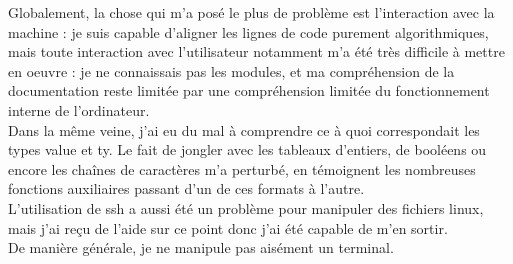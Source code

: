 \documentclass[a4paper]{article}
\begin{document}
    Globalement, la chose qui m'a posé le plus de problème est l'interaction avec la machine : je suis capable d'aligner les lignes de code purement algorithmiques, mais toute interaction avec l'utilisateur notamment m'a été très difficile à mettre en oeuvre : je ne connaissais pas les modules, et ma compréhension de la documentation reste limitée par une compréhension limitée du fonctionnement interne de l'ordinateur.\\
    Dans la même veine, j'ai eu du mal à comprendre ce à quoi correspondait les types value et ty. Le fait de jongler avec les tableaux d'entiers, de booléens ou encore les chaînes de caractères m'a perturbé, en témoignent les nombreuses fonctions auxiliaires passant d'un de ces formats à l'autre.\\
    L'utilisation de ssh a aussi été un problème pour manipuler des fichiers linux, mais j'ai reçu de l'aide sur ce point donc j'ai été capable de m'en sortir.\\
    De manière générale, je ne manipule pas aisément un terminal.
\end{document}
